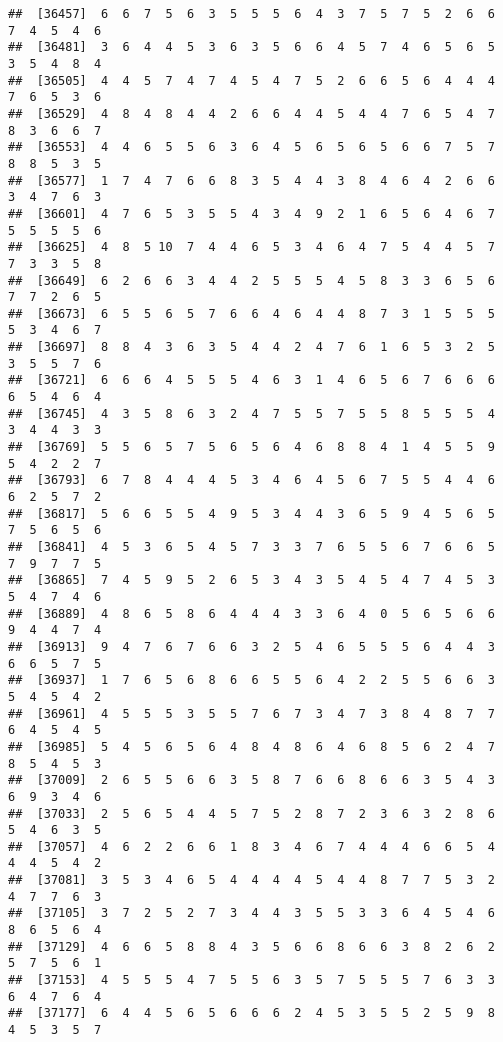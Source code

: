 \documentclass[
]{book}
\begin{document}
\begin{verbatim}
##  [36457]  6  6  7  5  6  3  5  5  5  6  4  3  7  5  7  5  2  6  6  7  4  5  4  6
##  [36481]  3  6  4  4  5  3  6  3  5  6  6  4  5  7  4  6  5  6  5  3  5  4  8  4
##  [36505]  4  4  5  7  4  7  4  5  4  7  5  2  6  6  5  6  4  4  4  7  6  5  3  6
##  [36529]  4  8  4  8  4  4  2  6  6  4  4  5  4  4  7  6  5  4  7  8  3  6  6  7
##  [36553]  4  4  6  5  5  6  3  6  4  5  6  5  6  5  6  6  7  5  7  8  8  5  3  5
##  [36577]  1  7  4  7  6  6  8  3  5  4  4  3  8  4  6  4  2  6  6  3  4  7  6  3
##  [36601]  4  7  6  5  3  5  5  4  3  4  9  2  1  6  5  6  4  6  7  5  5  5  5  6
##  [36625]  4  8  5 10  7  4  4  6  5  3  4  6  4  7  5  4  4  5  7  7  3  3  5  8
##  [36649]  6  2  6  6  3  4  4  2  5  5  5  4  5  8  3  3  6  5  6  7  7  2  6  5
##  [36673]  6  5  5  6  5  7  6  6  4  6  4  4  8  7  3  1  5  5  5  5  3  4  6  7
##  [36697]  8  8  4  3  6  3  5  4  4  2  4  7  6  1  6  5  3  2  5  3  5  5  7  6
##  [36721]  6  6  6  4  5  5  5  4  6  3  1  4  6  5  6  7  6  6  6  6  5  4  6  4
##  [36745]  4  3  5  8  6  3  2  4  7  5  5  7  5  5  8  5  5  5  4  3  4  4  3  3
##  [36769]  5  5  6  5  7  5  6  5  6  4  6  8  8  4  1  4  5  5  9  5  4  2  2  7
##  [36793]  6  7  8  4  4  4  5  3  4  6  4  5  6  7  5  5  4  4  6  6  2  5  7  2
##  [36817]  5  6  6  5  5  4  9  5  3  4  4  3  6  5  9  4  5  6  5  7  5  6  5  6
##  [36841]  4  5  3  6  5  4  5  7  3  3  7  6  5  5  6  7  6  6  5  7  9  7  7  5
##  [36865]  7  4  5  9  5  2  6  5  3  4  3  5  4  5  4  7  4  5  3  5  4  7  4  6
##  [36889]  4  8  6  5  8  6  4  4  4  3  3  6  4  0  5  6  5  6  6  9  4  4  7  4
##  [36913]  9  4  7  6  7  6  6  3  2  5  4  6  5  5  5  6  4  4  3  6  6  5  7  5
##  [36937]  1  7  6  5  6  8  6  6  5  5  6  4  2  2  5  5  6  6  3  5  4  5  4  2
##  [36961]  4  5  5  5  3  5  5  7  6  7  3  4  7  3  8  4  8  7  7  6  4  5  4  5
##  [36985]  5  4  5  6  5  6  4  8  4  8  6  4  6  8  5  6  2  4  7  8  5  4  5  3
##  [37009]  2  6  5  5  6  6  3  5  8  7  6  6  8  6  6  3  5  4  3  6  9  3  4  6
##  [37033]  2  5  6  5  4  4  5  7  5  2  8  7  2  3  6  3  2  8  6  5  4  6  3  5
##  [37057]  4  6  2  2  6  6  1  8  3  4  6  7  4  4  4  6  6  5  4  4  4  5  4  2
##  [37081]  3  5  3  4  6  5  4  4  4  4  5  4  4  8  7  7  5  3  2  4  7  7  6  3
##  [37105]  3  7  2  5  2  7  3  4  4  3  5  5  3  3  6  4  5  4  6  8  6  5  6  4
##  [37129]  4  6  6  5  8  8  4  3  5  6  6  8  6  6  3  8  2  6  2  5  7  5  6  1
##  [37153]  4  5  5  5  4  7  5  5  6  3  5  7  5  5  5  7  6  3  3  6  4  7  6  4
##  [37177]  6  4  4  5  6  5  6  6  6  2  4  5  3  5  5  2  5  9  8  4  5  3  5  7

\end{verbatim}
\end{document}
